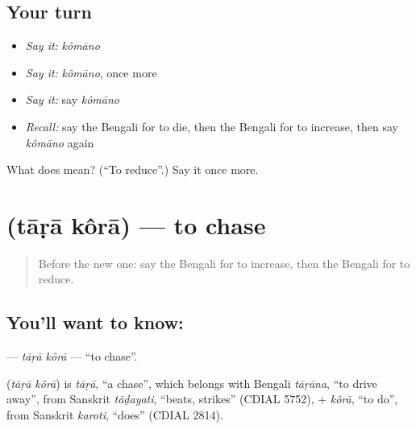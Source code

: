 \subsection*{Your turn}
\begin{itemize}
\raggedright
  \item \emph{Say it:} \emph{kômāno}
  \item \emph{Say it:} \emph{kômāno}, once more
  \item \emph{Say it:} say \emph{kômāno}
  \item \emph{Recall:} say the Bengali for to die, then the Bengali for to increase, then say \emph{kômāno} again
\end{itemize}

\begin{tcolorbox}[breakable,colback=teal!4,colframe=teal!35!black,title={Before you move on}]
What does  mean? (\textquotedblleft{}To reduce\textquotedblright{}.) Say it once more.
\end{tcolorbox}
\section[\texorpdfstring{\bn{তাড়া} \bn{করা} (tāṛā kôrā)}{তাড়া করা (tāṛā kôrā)}]{  (tāṛā kôrā) — to chase}

\label{lesson:BN-C238-tara-kora}



\begin{quote}
Before the new one: say the Bengali for to increase, then the Bengali for to reduce.
\end{quote}

\subsection*{You'll want to know:  }
\textbf{ } — \emph{tāṛā kôrā} — \textquotedblleft{}to chase\textquotedblright{}.

\begin{cousinweb}
\textbf{ } (\emph{tāṛā kôrā}) is \emph{tāṛā}, \textquotedblleft{}a chase\textquotedblright{}, which belongs with Bengali \emph{tāṛāna}, \textquotedblleft{}to drive away\textquotedblright{}, from Sanskrit \emph{tāḍayati}, \textquotedblleft{}beats, strikes\textquotedblright{} (CDIAL 5752), + \emph{kôrā}, \textquotedblleft{}to do\textquotedblright{}, from Sanskrit \emph{karoti}, \textquotedblleft{}does\textquotedblright{} (CDIAL 2814).
\end{cousinweb}


